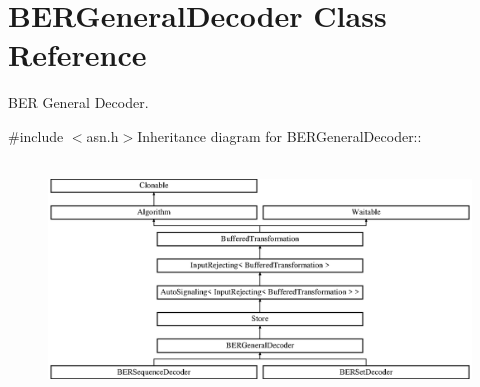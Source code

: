 \hypertarget{class_b_e_r_general_decoder}{
\section{BERGeneralDecoder Class Reference}
\label{class_b_e_r_general_decoder}
}


BER General Decoder.  


{\ttfamily \#include $<$asn.h$>$}Inheritance diagram for BERGeneralDecoder::\begin{figure}[H]
\begin{center}
\leavevmode
\includegraphics[height=6.25698cm]{class_b_e_r_general_decoder}
\end{center}
\end{figure}

